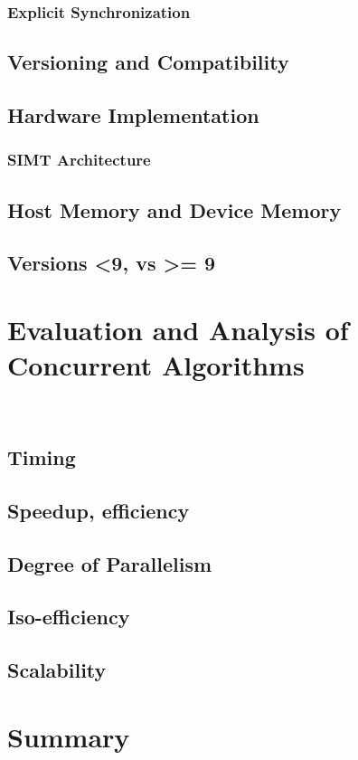 \subsubsection{Explicit Synchronization}%
\subsection{Versioning and Compatibility}%
\subsection{Hardware Implementation}%
\subsubsection{SIMT Architecture}%
\subsection{Host Memory and Device Memory}
\subsection{Versions <9, vs >= 9}
%
%
%
%
%
\section{Evaluation and Analysis of Concurrent Algorithms}~\cite[p.~330]{Lang17}
%
\subsection{Timing}
%
\subsection{Speedup, efficiency}


%
\subsection{Degree of Parallelism}
%
\subsection{Iso-efficiency}
%
\subsection{Scalability}
%
%
%
%
%
\section{Summary}
%
